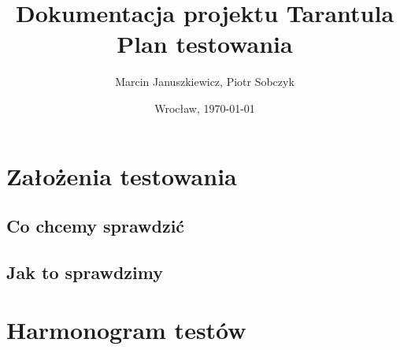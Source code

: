 \documentclass[11pt,leqno]{article}
\title{\LARGE Dokumentacja projektu \textbf{Tarantula}\\
							Plan testowania}
\author{Marcin Januszkiewicz, Piotr Sobczyk}
\date{Wrocław, \today}
\begin{document}
\maketitle 
\newpage
\tableofcontents
\newpage
\pagestyle{headings}

\section{Założenia testowania}
\subsection{Co chcemy sprawdzić}


\subsection{Jak to sprawdzimy}

\section{Harmonogram testów}
\end{document}
